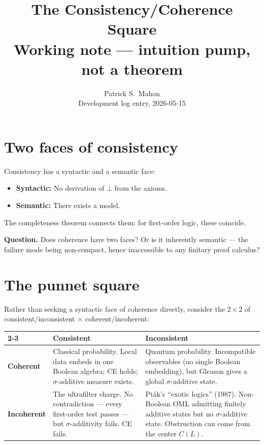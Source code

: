 \documentclass[11pt]{article}
\title{The Consistency/Coherence Square\\
\large Working note --- intuition pump, not a theorem}
\author{Patrick S.\ Mahon \\ \small Development log entry, 2026-05-15}
\date{}
\begin{document}
\maketitle

\section*{Two faces of consistency}

Consistency has a syntactic and a semantic face:
\begin{itemize}[nosep]
  \item \textbf{Syntactic:} No derivation of $\bot$ from the axioms.
  \item \textbf{Semantic:} There exists a model.
\end{itemize}
The completeness theorem connects them: for first-order logic, these coincide.

\medskip\noindent
\textbf{Question.} Does coherence have two faces?  Or is it inherently
semantic --- the failure mode being non-compact, hence inaccessible to
any finitary proof calculus?

\section*{The punnet square}

Rather than seeking a syntactic face of coherence directly, consider
the $2 \times 2$ of consistent/inconsistent $\times$ coherent/incoherent:

\bigskip
\begin{center}
\begin{tabular}{l|p{5.5cm}|p{5.5cm}|}
\cline{2-3}
& \textbf{Consistent} & \textbf{Inconsistent} \\
\hline
\multicolumn{1}{|l|}{\textbf{Coherent}}
& Classical probability.  Local data embeds in one Boolean algebra;
  CE holds; $\sigma$-additive measure exists.
& Quantum probability.  Incompatible observables (no single Boolean
  embedding), but Gleason gives a global $\sigma$-additive state. \\
\hline
\multicolumn{1}{|l|}{\textbf{Incoherent}}
& The ultrafilter charge.  No contradiction --- every first-order test
  passes --- but $\sigma$-additivity fails.  CE fails.
& Pt\'{a}k's ``exotic logics'' (1987).  Non-Boolean OML admitting
  finitely additive states but no $\sigma$-additive state.
  Obstruction can come from the center $C(L)$. \\
\hline
\end{tabular}
\end{center}
\end{document}
